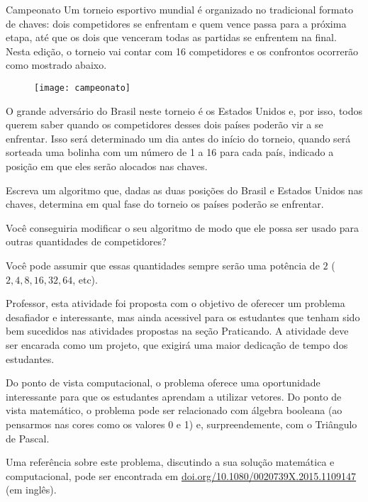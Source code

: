 \begin{task}{Campeonato}
Um torneio esportivo mundial é organizado no tradicional formato de chaves: dois competidores se enfrentam e quem vence passa para a próxima etapa, até que os dois que venceram todas as partidas se enfrentem na final. Nesta edição, o torneio vai contar com 16 competidores e os confrontos ocorrerão como mostrado abaixo.

\begin{figure}[H]
\centering

\texttt{[image: campeonato]}
\end{figure}

O grande adversário do Brasil neste torneio é os Estados Unidos e, por isso, todos querem saber quando os competidores desses dois países poderão vir a se enfrentar. Isso será determinado um dia antes do início do torneio, quando será sorteada uma bolinha com um número de 1 a 16 para cada país, indicado a posição em que eles serão alocados nas chaves.

Escreva um algoritmo que, dadas as duas posições do Brasil e Estados Unidos nas chaves, determina em qual fase do torneio os países poderão se enfrentar.
\end{task}

\begin{reflection}
Você conseguiria modificar o seu algoritmo de modo que ele possa ser usado para outras quantidades de competidores?

Você pode assumir que essas quantidades sempre serão uma potência de $2$ ($2, 4, 8, 16, 32, 64$, etc).
\end{reflection}

\label{comp-know3}

\clearmargin
\begin{texto}
{
Professor, esta atividade foi proposta com o objetivo de oferecer um problema desafiador e interessante, mas ainda acessivel para os estudantes que tenham sido bem sucedidos nas atividades propostas na seção Praticando. A atividade deve ser encarada como um projeto, que exigirá uma maior dedicação de tempo dos estudantes.

Do ponto de vista computacional, o problema oferece uma oportunidade interessante para que os estudantes aprendam a utilizar vetores. Do ponto de vista matemático, o problema pode ser relacionado com álgebra booleana (ao pensarmos nas cores como os valores 0 e 1) e, surpreendemente, com o Triângulo de Pascal.

Uma referência sobre este problema, discutindo a sua solução matemática e computacional, pode ser encontrada em \url{doi.org/10.1080/0020739X.2015.1109147} (em inglês).
}
\end{texto}

